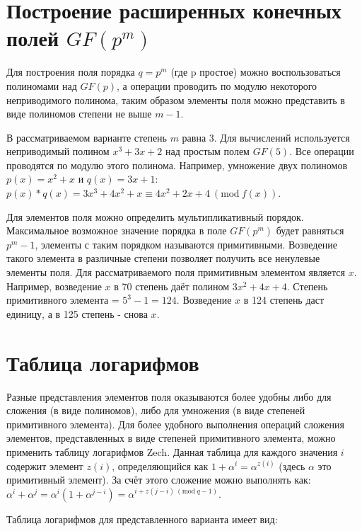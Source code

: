 \documentclass[a4paper,14pt]{extarticle}
\begin{document}
	\section{Построение расширенных конечных полей $GF(p^m)$}
	
	Для построения поля порядка $q=p^m$ (где p простое) можно воспользоваться полиномами над $GF(p)$, а операции проводить по модулю некоторого неприводимого полинома, таким образом элементы поля можно представить в виде полиномов степени не выше $m-1$.
	
	В рассматриваемом варианте степень $m$ равна $3$. Для вычислений используется неприводимый полином $x^3 + 3x + 2$ над простым полем $GF(5)$. Все операции проводятся по модулю этого полинома. Например, умножение двух полиномов $p(x) = x^2+x$ и $q(x) = 3x+1$: $p(x) * q(x) = 3x^3+4x^2+x \equiv 4x^2+2x+4 \ (\textrm{mod}\ f(x))$.
	
	Для элементов поля можно определить мультипликативный порядок. Максимальное возможное значение порядка в поле $GF(p^m)$ будет равняться $p^m - 1$, элементы с таким порядком называются примитивными. Возведение такого элемента в различные степени позволяет получить все ненулевые элементы поля. Для рассматриваемого поля примитивным элементом является $x$. Например, возведение $x$ в 70 степень даёт полином $3x^2 + 4x + 4$. Степень примитивного элемента = $5^3 - 1 = 124$. Возведение $x$ в 124 степень даст единицу, а в 125 степень - снова $x$.
	
	\section{Таблица логарифмов}
	
	Разные представления элементов поля оказываются более удобны либо для сложения (в виде полиномов), либо для умножения (в виде степеней примитивного элемента). Для более удобного выполнения операций сложения элементов, представленных в виде степеней примитивного элемента, можно применить таблицу логарифмов Zech. Данная таблица для каждого значения $i$ содержит элемент $z(i)$, определяющийся как $1+\alpha^i = \alpha^{z(i)}$ (здесь $\alpha$ это примитивный элемент). За счёт этого сложение можно выполнять как: $\alpha^i + \alpha^j = \alpha^i ( 1 + \alpha^{j-i}) = \alpha^{i+z(j-i) \ (\textrm{mod}\ q-1)}$.
	
	Таблица логарифмов для представленного варианта имеет вид:
	
\end{document}
